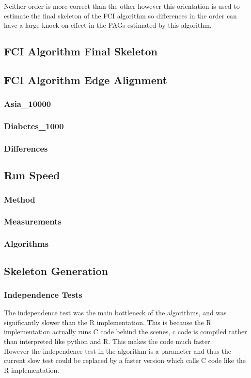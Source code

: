 \documentclass{article}
\begin{document}
Neither order is more correct than the other however this orientation is used to estimate the final skeleton of the FCI algorithm so differences in the order can have a large knock on effect in the PAGs estimated by this algorithm.

\subsection{FCI Algorithm Final Skeleton}


\subsection{FCI Algorithm Edge Alignment}
\subsubsection{Asia\_10000}
\subsubsection{Diabetes\_1000}
\subsubsection{Differences}
\subsection{Run Speed}
\subsubsection{Method}
\subsubsection{Measurements}
\subsubsection{Algorithms}
\subsection{Skeleton Generation}
\subsubsection{Independence Tests}
The independence test was the main bottleneck of the algorithms, and was significantly slower than the R implementation. This is because the R implementation actually runs C code behind the scenes, c code is compiled rather than interpreted like python and R. This makes the code much faster.\\
 
However the independence test in the algorithm is a parameter and thus the current slow test could be replaced by a faster version which calls C code like the R implementation.\\ 
\end{document}
